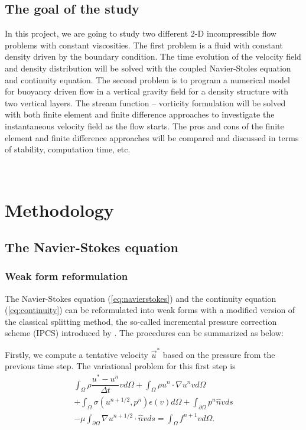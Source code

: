 \documentclass[12pt]{article}
\numberwithin{figure}{section}  %
\numberwithin{equation}{section}  %
\begin{document}
\begin{multicols}{2}
\subsection{The goal of the study}

In this project, we are going to study two different 2-D incompressible flow problems with constant viscosities. The first problem is a fluid with constant density driven by the boundary condition. The time evolution of the velocity field and density distribution will be solved with the coupled Navier-Stoles equation and continuity equation. The second problem is to program a numerical model for buoyancy driven flow in a vertical gravity field for a density structure with two vertical layers. The stream function – vorticity formulation will be solved with both finite element and finite difference approaches to investigate the instantaneous velocity field as the flow starts. The pros and cons of the finite element and finite difference approaches will be compared and discussed in terms of stability, computation time, etc.

~\\

\section{Methodology}

\subsection{The Navier-Stokes equation}

\subsubsection{Weak form reformulation}

The Navier-Stokes equation (\ref{eq:navierstokes}) and the continuity equation (\ref{eq:continuity}) can be reformulated into weak forms with a modified version of the classical splitting method, the so-called incremental pressure correction scheme (IPCS) introduced by \citet{goda1979multistep}. The procedures can be summarized as below:

Firstly, we compute a tentative velocity $\vec{u}^*$ based on the pressure from the previous time step. The variational problem for this first step is
\begin{multline}\label{eq:stepone}
	\int_\Omega\rho\dfrac{u^*-u^n}{\Delta{t}}vd\Omega + \int_\Omega\rho{u}^n\cdot\nabla{u}^nvd\Omega \\
	+ \int_\Omega\sigma(u^{n+1/2},p^n)\epsilon(v)d\Omega + \int_{\partial\Omega}p^n\hat{n}vds \\
	- \mu\int_{\partial\Omega}\nabla{u}^{n+1/2}\cdot\hat{n}vds = \int_\Omega{f}^{n+1}vd\Omega.
\end{multline}


\end{multicols}
\end{document}
